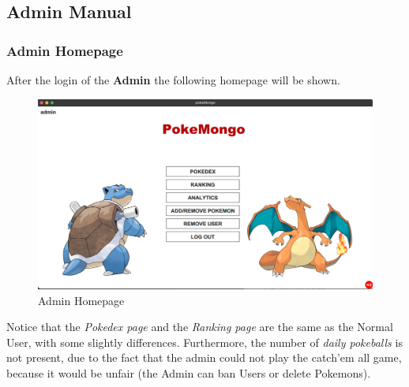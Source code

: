 \subsection{Admin Manual}
\subsubsection{Admin Homepage}
After the login of the \textbf{Admin} the following homepage will be shown.
\begin{figure}[H]
	\centering
	\includegraphics[width=\textwidth]{img/userManual/admin_homepage.png}
	\caption{Admin Homepage}
\end{figure}
Notice that the \textit{Pokedex page} and the \textit{Ranking page} are the same as the Normal User, with some slightly differences. Furthermore, the number of \textit{daily pokeballs} is not present, due to the fact that the admin could not play the catch'em all game, because it would be unfair (the Admin can ban Users or delete Pokemons).

